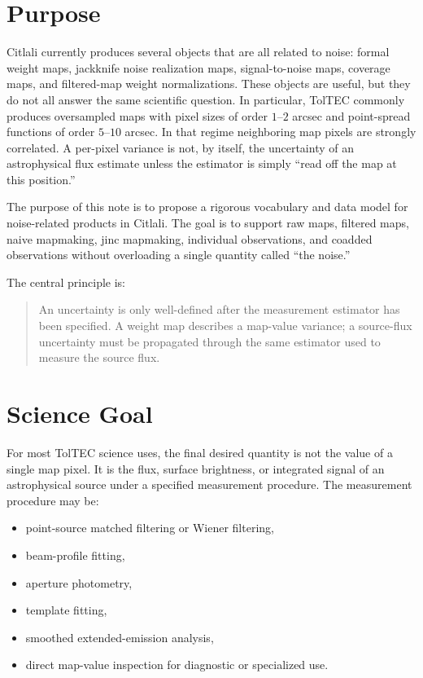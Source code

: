 \documentclass[11pt]{article}
\begin{document}
\tableofcontents
\newpage

\section{Purpose}

Citlali currently produces several objects that are all related to noise:
formal weight maps, jackknife noise realization maps, signal-to-noise maps,
coverage maps, and filtered-map weight normalizations. These objects are
useful, but they do not all answer the same scientific question. In particular,
TolTEC commonly produces oversampled maps with pixel sizes of order
\(1\)--\(2\) arcsec and point-spread functions of order \(5\)--\(10\) arcsec.
In that regime neighboring map pixels are strongly correlated. A per-pixel
variance is not, by itself, the uncertainty of an astrophysical flux estimate
unless the estimator is simply ``read off the map at this position.''

The purpose of this note is to propose a rigorous vocabulary and data model for
noise-related products in Citlali. The goal is to support raw maps, filtered
maps, naive mapmaking, jinc mapmaking, individual observations, and coadded
observations without overloading a single quantity called ``the noise.''

The central principle is:

\begin{quote}
An uncertainty is only well-defined after the measurement estimator has been
specified. A weight map describes a map-value variance; a source-flux
uncertainty must be propagated through the same estimator used to measure the
source flux.
\end{quote}

\section{Science Goal}

For most TolTEC science uses, the final desired quantity is not the value of a
single map pixel. It is the flux, surface brightness, or integrated signal of
an astrophysical source under a specified measurement procedure. The
measurement procedure may be:

\begin{itemize}[leftmargin=1.5em]
\item point-source matched filtering or Wiener filtering,
\item beam-profile fitting,
\item aperture photometry,
\item template fitting,
\item smoothed extended-emission analysis,
\item direct map-value inspection for diagnostic or specialized use.
\end{itemize}
\end{document}

